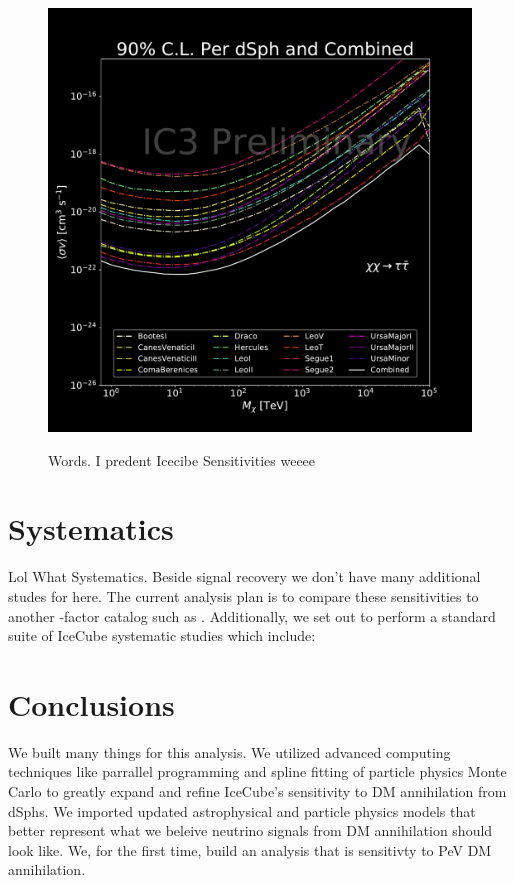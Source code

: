 \begin{figure}[b]
{        \includegraphics[scale=0.275]{figures/ic_DM/dm_plots/tautau_money_plot_comb.pdf}
    }
    \caption{Words. I predent Icecibe Sensitivities weeee}
    \label{fig:icDM_sensitivity_2of2}
\end{figure}
\section{Systematics} \label{sec:icDM_Systematics}

Lol What Systematics.
Beside signal recovery we don't have many additional studes for here.
The current analysis plan is to compare these sensitivities to another \J-factor catalog such as \LS \cite{DM_Strigari20}.
Additionally, we set out to perform a standard suite of IceCube systematic studies which include: 

\section{Conclusions} \label{sec:icDM_conclude}

We built many things for this analysis.
We utilized advanced computing techniques like parrallel programming and spline fitting of particle physics Monte Carlo to greatly expand and refine IceCube's sensitivity to DM annihilation from dSphs.
We imported updated astrophysical and particle physics models that better represent what we beleive neutrino signals from DM annihilation should look like.
We, for the first time, build an analysis that is sensitivty to PeV DM annihilation.

